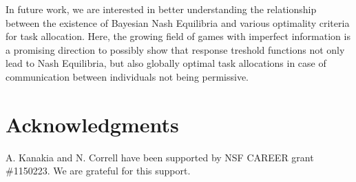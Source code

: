 \documentclass[smallextended]{svjour3}       %
\begin{document}
In future work, we are interested in better understanding the relationship between the existence of Bayesian Nash Equilibria and various optimality criteria for task allocation. Here, the growing field of games with imperfect information is a promising direction to possibly show that response treshold functions not only lead to Nash Equilibria, but also globally optimal task allocations in case of communication between individuals not being permissive.

\section*{Acknowledgments}
A. Kanakia and N. Correll have been supported by NSF CAREER grant \#1150223. We are grateful for this support.






\end{document}

